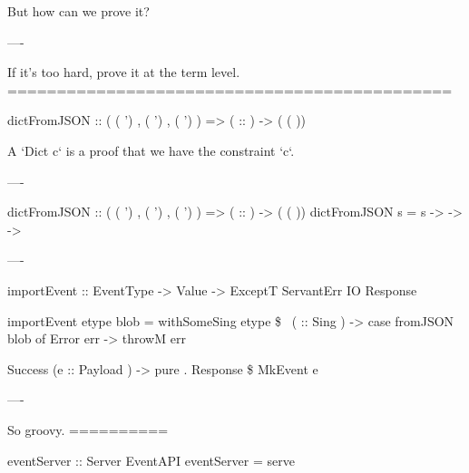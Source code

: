 But how can we prove it?

----

If it's too hard, prove it at the term level.
=============================================

\begin{custom}
  dictFromJSON :: (  ( ')
                  ,  ( ')
                  ,  ( ')
                  )
               =>  ( :: )
               ->  ( ( ))
\end{custom}

A `Dict c` is a proof that we have the constraint `c`.

----

\begin{custom}
  dictFromJSON :: (  ( ')
                  ,  ( ')
                  ,  ( ')
                  )
               =>  ( :: )
               ->  ( ( ))
  dictFromJSON s =  s 
      -> 
         -> 
     -> 
\end{custom}

----

\begin{raw}
  importEvent :: EventType
              -> Value
              -> ExceptT ServantErr IO Response

  importEvent etype blob =
    withSomeSing etype \$ \ ( :: Sing ) ->
          case fromJSON blob of
            Error err ->
              throwM err

            Success (e :: Payload ) ->
              pure . Response \$ MkEvent e
\end{raw}

----

So groovy.
==========

\begin{raw}
  eventServer :: Server EventAPI
  eventServer = serve 
\end{raw}

